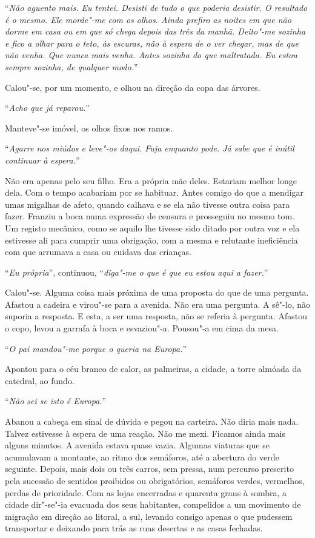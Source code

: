 ``\emph{Não aguento mais. Eu tentei. Desisti de tudo o que poderia
desistir. O resultado é o mesmo. Ele morde"-me com os olhos. Ainda
prefiro as noites em que não dorme em casa ou em que só chega depois das
três da manhã. Deito"-me sozinha e fico a olhar para o teto, às
escuras, não à espera de o ver chegar, mas de que não venha. Que nunca
mais venha. Antes sozinha do que maltratada. Eu estou sempre sozinha, de
qualquer modo.}''

Calou"-se, por um momento, e olhou na direção da copa das árvores.

``\emph{Acho que já reparou.}''

Manteve"-se imóvel, os olhos fixos nos ramos.

``\emph{Agarre nos miúdos e leve"-os daqui. Fuja enquanto pode. Já sabe
que é inútil continuar à espera.}''

Não era apenas pelo seu filho. Era a própria mãe deles. Estariam melhor
longe dela. Com o tempo acabariam por se habituar. Antes comigo do que a
mendigar umas migalhas de afeto, quando calhava e se ela não tivesse
outra coisa para fazer. Franziu a boca numa expressão de censura e
prosseguiu no mesmo tom. Um registo mecânico, como se aquilo lhe tivesse
sido ditado por outra voz e ela estivesse ali para cumprir uma
obrigação, com a mesma e relutante ineficiência com que arrumava a casa
ou cuidava das crianças.

``\emph{Eu própria}'',
continuou,
``\emph{diga"-me o que é que eu estou aqui a fazer.}''

Calou"-se. Alguma coisa mais próxima de uma proposta do que de uma
pergunta. Afastou a cadeira e virou"-se para a avenida. Não era uma
pergunta. A sê"-lo, não suporia a resposta. E esta, a ser uma resposta,
não se referia à pergunta. Afastou o copo, levou a garrafa à boca e
esvaziou"-a. Pousou"-a em cima da mesa.

``\emph{O pai mandou"-me porque o queria na Europa.}''

Apontou para o céu branco de calor, as palmeiras, a cidade, a torre
almóada da catedral, ao fundo.

``\emph{Não sei se isto é Europa.}''

Abanou a cabeça em sinal de dúvida e pegou na carteira. Não diria mais
nada. Talvez estivesse à espera de uma reação. Não me mexi. Ficamos
ainda mais alguns minutos. A avenida estava quase vazia. Algumas
viaturas que se acumulavam a montante, ao ritmo dos semáforos, até a
abertura do verde seguinte. Depois, mais dois ou três carros, sem
pressa, num percurso prescrito pela sucessão de sentidos proibidos ou
obrigatórios, semáforos verdes, vermelhos, perdas de prioridade. Com as
lojas encerradas e quarenta graus à sombra, a cidade dir"-se"-ia
evacuada dos seus habitantes, compelidos a um movimento de migração em
direção ao litoral, a sul, levando consigo apenas o que pudessem
transportar e deixando para trás as ruas desertas e as casas fechadas.

